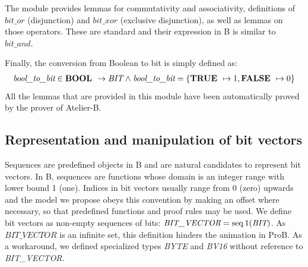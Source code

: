 \documentclass[a4paper]{llncs}
\begin{document}
The module provides lemmas for commutativity and associativity, definitions of $\textit{bit\_or}$ (disjunction)
and $\textit{bit\_xor}$ (exclusive disjunction), as well as lemmas on
those operators. These are standard and their expression in B is
similar to $\textit{bit\_and}$.

Finally, the conversion from Boolean to bit is simply defined as:
$$
\begin{array}{l}
\textit{bool\_to\_bit} \in \textbf{BOOL } \rightarrow \textit{BIT} \mathrel{\wedge} \textit{bool\_to\_bit} = \{ \textbf{TRUE } \mapsto 1, \textbf{FALSE } \mapsto 0 \} \\
\end{array}
$$
All the lemmas that are provided in this module have been
automatically proved by the prover of Atelier-B.


\subsection{Representation and manipulation of bit vectors}
\label{subsec:HardwareLibrary2}

Sequences are predefined objects in B and are natural candidates to
represent bit vectors. In B, sequences are functions whose domain
is an integer range with lower bound 1 (one). Indices in bit vectors
usually range from 0 (zero) upwards and the model we propose obeys
this convention by making an offset where necessary, so that
predefined functions and proof rules may be used. We define bit
vectors as non-empty sequences of bits: $\textit{BIT\_VECTOR} =
\mathop{\mathstrut{\rm seq}}\nolimits1 (\textit{BIT})$. As $\textit{BIT\_VECTOR}$ is an infinite set,
this definition hinders the animation in ProB.  As a workaround, we
defined specialized types \textit{BYTE} and \textit{BV16} without
reference to \textit{BIT\_VECTOR}.

%
\end{document}
